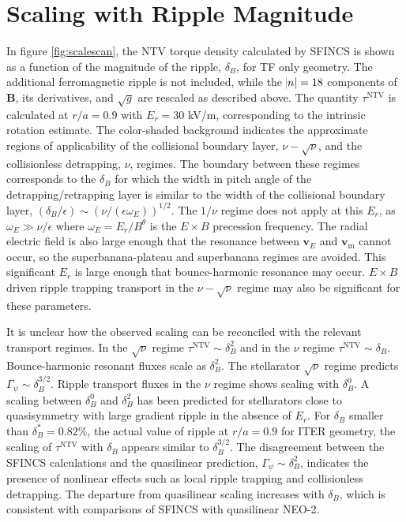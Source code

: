 \documentclass[aip, pop, preprint]{revtex4-1}
\numberwithin{figure}{section}
\numberwithin{equation}{section}
\begin{document}
\section{Scaling with Ripple Magnitude}\label{scaling}
In figure \ref{fig:scalescan}, the NTV torque density calculated by SFINCS is shown as a function of the magnitude of the ripple, $\delta_B$, for TF only geometry. The additional ferromagnetic ripple is not included, while the $\abs{n}=18$ components of $\bm{B}$, its derivatives, and $\sqrt{g}$ are rescaled as described above. The quantity $\tau^{\text{NTV}}$ is calculated at $r/a = 0.9$ with $E_r = 30$ kV/m, corresponding to the intrinsic rotation estimate. The color-shaded background indicates the approximate regions of applicability of the collisional boundary layer, $\nu-\sqrt{\nu}$, and the collisionless detrapping, $\nu$, regimes. The boundary between these regimes corresponds to the $\delta_B$ for which the width in pitch angle of the detrapping/retrapping layer is similar to the width of the collisional boundary layer, $(\delta_B/\epsilon) \sim (\nu/(\epsilon \omega_E))^{1/2}$. The $1/\nu$ regime\cite{Shaing2003} does not apply at this $E_r$, as $\omega_E \gg \nu/\epsilon$ where $\omega_E = E_r/B^{\theta}$ is the $E\times B$ precession frequency. The radial electric field is also large enough that the resonance between $\bm{v}_{E}$ and $\bm{v}_{\text{m}}$ cannot occur, so the superbanana-plateau \cite{Shaing2009_sbp} and superbanana \cite{Shaing2009_sb} regimes are avoided. This significant $E_r$ is large enough that bounce-harmonic resonance may occur.\cite{Park2009} $E \times B$ driven ripple trapping transport in the $\nu- \sqrt{\nu}$ regime may also be significant for these parameters.

It is unclear how the observed scaling can be reconciled with the relevant transport regimes. In the $\sqrt{\nu}$ regime $\tau^{\text{NTV}} \sim \delta_B^2$ and in the $\nu$ regime $\tau^{\text{NTV}} \sim \delta_B$. Bounce-harmonic resonant fluxes scale as $\delta_B^2$.\cite{Park2009} The stellarator $\sqrt{\nu}$ regime\cite{Ho1987} predicts $\Gamma_{\psi} \sim \delta_B^{3/2}$. Ripple transport fluxes in the $\nu$ regime shows scaling with $\delta_B^0$.\cite{Tsang1977,Linsker1982} A scaling between $\delta_B^0$ and $\delta_B^{2}$ has been predicted for stellarators close to quasisymmetry with large gradient ripple in the absence of $E_r$.\cite{Calvo2014} For $\delta_B$ smaller than $\delta_B^* = 0.82\%$, the actual value of ripple at $r/a=0.9$ for ITER geometry, the scaling of $\tau^{\text{NTV}}$ with $\delta_B$ appears similar to $\delta_B^{3/2}$. The disagreement between the SFINCS calculations and the quasilinear prediction, $\Gamma_{\psi} \sim \delta_B^2$, indicates the presence of nonlinear effects such as local ripple trapping and collisionless detrapping. The departure from quasilinear scaling increases with $\delta_B$, which is consistent with comparisons of SFINCS with quasilinear NEO-2.\cite{Martitsch2016} 
\end{document}
